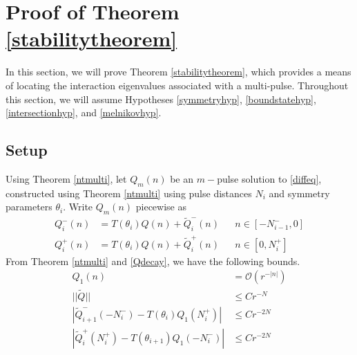\documentclass[12pt]{article}
\begin{document}
\section{Proof of Theorem \ref{stabilitytheorem}}

In this section, we will prove Theorem \ref{stabilitytheorem}, which provides a means of locating the interaction eigenvalues associated with a multi-pulse. Throughout this section, we will assume Hypotheses \ref{symmetryhyp}, \ref{boundstatehyp}, \ref{intersectionhyp}, and \ref{melnikovhyp}.

\subsection{Setup}

Using Theorem \ref{ntmulti}, let $Q_m(n)$ be an $m-$pulse solution to \eqref{diffeq}, constructed using Theorem \ref{ntmulti} using pulse distances $N_i$ and symmetry parameters $\theta_i$. Write $Q_m(n)$ piecewise as
\begin{equation}\label{Qmpiecewise}
\begin{aligned}
Q_i^-(n) &= T(\theta_i) Q(n) + \tilde{Q}_i^-(n) && n \in [-N_{i-1}^-, 0] \\
Q_i^+(n) &= T(\theta_i) Q(n) + \tilde{Q}_i^+(n) && n \in [0, N_i^+]
\end{aligned}
\end{equation}
From Theorem \ref{ntmulti} and \eqref{Qdecay}, we have the following bounds.
\begin{equation}\label{stabbounds1}
\begin{aligned}
Q_1(n) &= \mathcal{O}(r^{-|n|}) \\
||\tilde{Q}|| &\leq C r^{-N} \\
|\tilde{Q}_{i+1}^-(-N_i^-) - T(\theta_i) Q_1(N_i^+)| &\leq C r^{-2N} \\
|\tilde{Q}_i^+(N_i^+) - T(\theta_{i+1}) Q_1(-N_i^-)| &\leq C r^{-2N} \\
\end{aligned}
\end{equation}
\end{document}
